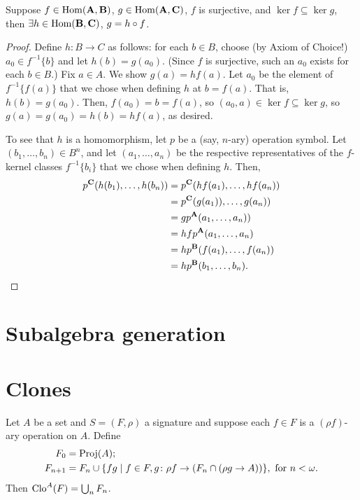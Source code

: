 \begin{lemma}
  \label{ex:1.26.8}
  Suppose $f \in \operatorname{Hom}(\mathbf{A},\mathbf{B})$, $g \in \operatorname{Hom}(\mathbf{A},\mathbf{C})$, 
  $f$ is surjective, and $\ker f \subseteq \ker g$, then $\exists h \in \operatorname{Hom}(\mathbf{B},\mathbf{C})$, $g = h \circ f$.
\end{lemma}
\begin{proof}
Define $h\colon B \to C$ as follows: for each $b\in B$, choose (by Axiom of Choice!) $a_0\in f^{-1}\{b\}$
and let $h(b) = g(a_0)$.  (Since $f$ is surjective, such an $a_0$ exists for each $b\in B$.)
Fix $a \in A$.  We show $g(a) = h f(a)$. Let $a_0$ be the element of $f^{-1}\{f(a)\}$ that we
chose when defining $h$ at $b = f(a)$. That is, $h(b) = g(a_0)$.
Then, $f(a_0) = b = f(a)$, so $(a_0, a) \in \ker f\subseteq \ker g$, so 
$g(a) = g(a_0) = h(b) = h f(a)$, as desired.

To see that $h$ is a homomorphism, let $p$ be a (say, $n$-ary) operation symbol.
Let $(b_1, \dots, b_n) \in B^n$, and let $(a_1, \dots, a_n)$ be the respective representatives
of the $f$-kernel classes $f^{-1}\{b_i\}$ that we chose when defining $h$.
Then,
\begin{align*}
p^{\mathbf{C}}(h(b_1), \dots, h(b_n)) &=  p^{\mathbf{C}}(h f(a_1), \dots, h f(a_n))\\
&=  p^{\mathbf{C}}(g(a_1)), \dots, g(a_n))\\
&=  g p^{\mathbf{A}}(a_1, \dots, a_n))\\
&=  h f p^{\mathbf{A}}(a_1, \dots, a_n)\\
&=  h p^{\mathbf{B}}(f(a_1), \dots, f(a_n))\\
&=  h p^{\mathbf{B}}(b_1, \dots, b_n).
\end{align*}
\end{proof}

\section{Subalgebra generation}

\section{Clones}
\begin{theorem} 
 Let $A$ be a set and $S = (F, \rho)$ a signature and suppose each $f\in F$ 
 is a $(\rho f)$-ary operation on $A$. Define
 \begin{align*}
  F_0 &= \operatorname{Proj}(A);\\
 F_{n+1} &= F_n \cup \{ f g \mid f \in F, g \colon \rho f \to (F_n \cap (\rho g \to A)) \}, \text{ for } n < \omega.
 \end{align*}
 Then $\operatorname{Clo}^A(F) =  \bigcup_n F_n$.
\end{theorem}
 

